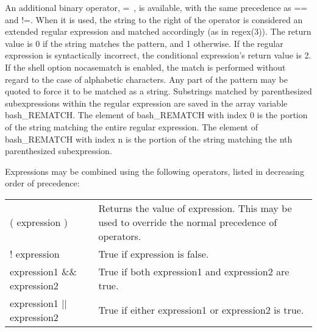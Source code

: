 \documentclass[11pt]{article}
\begin{document}
An additional binary operator, =~, is available, with the same precedence as == and !=. When it is used, the string to the right of the operator is considered an extended regular expression and matched accordingly (as in regex(3)). The return value is 0 if the string matches the pattern, and 1 otherwise. If the regular expression is syntactically incorrect, the conditional expression's return value is 2. If the shell option nocasematch is enabled, the match is performed without regard to the case of alphabetic characters. Any part of the pattern may be quoted to force it to be matched as a string. Substrings matched by parenthesized subexpressions within the regular expression are saved in the array variable bash\_REMATCH. The element of bash\_REMATCH with index 0 is the portion of the string matching the entire regular expression. The element of bash\_REMATCH with index n is the portion of the string matching the nth parenthesized subexpression.

Expressions may be combined using the following operators, listed in decreasing order of precedence:

\begin{longtable}{p{}p{}}
( expression ) &
Returns the value of expression. This may be used to override the normal precedence of operators. \\

! expression &
True if expression is false. \\

expression1 \&\& expression2 &
True if both expression1 and expression2 are true. \\

expression1 || expression2 &
True if either expression1 or expression2 is true. \\
\end{longtable}
\end{document}
